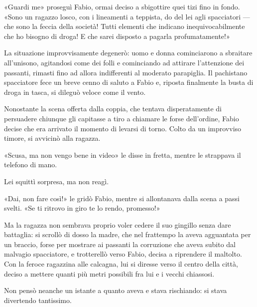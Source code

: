«Guardi me» proseguì Fabio, ormai deciso a sbigottire quei tizi fino in fondo. «Sono un ragazzo losco, con i lineamenti a teppista, do del lei agli spacciatori --- che sono la feccia della società! Tutti elementi che indicano inequivocabilmente che ho bisogno di droga! E che sarei disposto a pagarla profumatamente!»

La situazione improvvisamente degenerò: uomo e donna cominciarono a sbraitare all'unisono, agitandosi come dei folli e cominciando ad attirare l'attenzione dei passanti, rimasti fino ad allora indifferenti al moderato parapiglia. Il pachistano spacciatore fece un breve cenno di saluto a Fabio e, riposta finalmente la busta di droga in tasca, si dileguò veloce come il vento.

Nonostante la scena offerta dalla coppia, che tentava disperatamente di persuadere chiunque gli capitasse a tiro a chiamare le forse dell'ordine, Fabio decise che era arrivato il momento di levarsi di torno. Colto da un improvviso timore, si avvicinò alla ragazza.

«Scusa, ma non vengo bene in video» le disse in fretta, mentre le strappava il telefono di mano.

Lei squittì sorpresa, ma non reagì.

«Dai, non fare così!» le gridò Fabio, mentre si allontanava dalla scena a passi svelti. «Se ti ritrovo in giro te lo rendo, promesso!»

Ma la ragazza non sembrava proprio voler cedere il suo gingillo senza dare battaglia: si scrollò di dosso la madre, che nel frattempo la aveva agguantata per un braccio, forse per mostrare ai passanti la corruzione che aveva subito dal malvagio spacciatore, e trotterellò verso Fabio, decisa a riprendere il maltolto. Con la feroce ragazzina alle calcagna, lui si diresse verso il centro della città, deciso a mettere quanti più metri possibili fra lui e i vecchi chiassosi.

Non pensò neanche un istante a quanto aveva e stava rischiando: si stava divertendo tantissimo.
